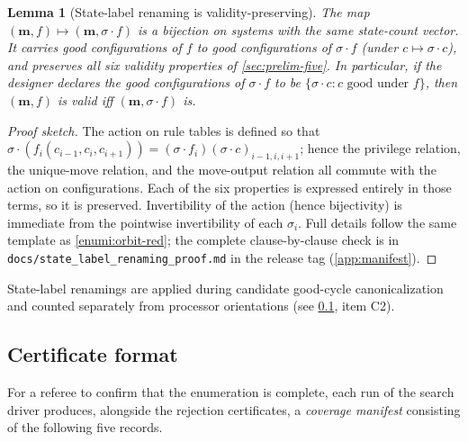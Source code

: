 \documentclass[11pt,a4paper]{article}
\theoremstyle{plain}
\newtheorem{lemma}[theorem]{Lemma}
\theoremstyle{definition}
\begin{document}
\begin{enumerate}[leftmargin=*]
\begin{lemma}[State-label renaming is validity-preserving]\label{lem:state-label-bijection}
The map $(\mathbf{m}, f) \mapsto (\mathbf{m}, \sigma \cdot f)$ is a
bijection on systems with the same state-count vector.  It carries
good configurations of $f$ to good configurations of $\sigma \cdot
f$ (under $c \mapsto \sigma \cdot c$), and preserves all six
validity properties of \cref{sec:prelim-five}.  In particular, if
the designer declares the good configurations of $\sigma \cdot f$
to be $\{\sigma \cdot c : c \text{ good under } f\}$, then
$(\mathbf{m}, f)$ is valid iff $(\mathbf{m}, \sigma \cdot f)$ is.
\end{lemma}

\begin{proof}[Proof sketch]
The action on rule tables is defined so that
$\sigma \cdot (f_i(c_{i-1}, c_i, c_{i+1})) = (\sigma \cdot
f_i)(\sigma \cdot c)_{i-1,i,i+1}$; hence the privilege relation,
the unique-move relation, and the move-output relation all commute
with the action on configurations.  Each of the six properties is
expressed entirely in those terms, so it is preserved.  Invertibility
of the action (hence bijectivity) is immediate from the pointwise
invertibility of each $\sigma_i$.  Full details follow the same
template as \cref{enumi:orbit-red}; the complete
clause-by-clause check is in
\texttt{docs/state\_label\_renaming\_proof.md} in the release tag
(\cref{app:manifest}).
\end{proof}

State-label renamings are applied during candidate good-cycle
canonicalization and counted separately from processor orientations
(see \cref{app:exhaust-certificate}, item C2).
\end{enumerate}

\subsection{Certificate format}\label{app:exhaust-certificate}

For a referee to confirm that the enumeration is complete, each run of
the search driver produces, alongside the rejection certificates, a
\emph{coverage manifest} consisting of the following five records.
\end{document}
